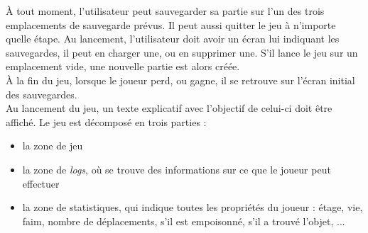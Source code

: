 \documentclass[11pt]{report}
\begin{document}
	À tout moment, l'utilisateur peut sauvegarder sa partie sur l'un des trois emplacements de sauvegarde prévus. Il peut aussi quitter le jeu à n'importe quelle étape. Au lancement, l'utilisateur doit avoir un écran lui indiquant les sauvegardes, il peut en charger une, ou en supprimer une. S'il lance le jeu sur un emplacement vide, une nouvelle partie est alors créée.\\
	À la fin du jeu, lorsque le joueur perd, ou gagne, il se retrouve sur l'écran initial des sauvegardes.\\
	Au lancement du jeu, un texte explicatif avec l'objectif de celui-ci doit être affiché. Le jeu est décomposé en trois parties :
	\begin{itemize}
	\item la zone de jeu
	\item la zone de \emph{logs}, où se trouve des informations sur ce que le joueur peut effectuer
	\item la zone de statistiques, qui indique toutes les propriétés du joueur : étage, vie, faim, nombre de déplacements, s'il est empoisonné, s'il a trouvé l'objet, ...
	\end{itemize}
	
	
\end{document}
